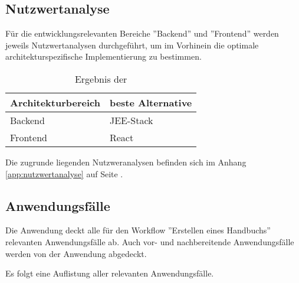\documentclass[12pt, xcolor=dvipsnames]{scrartcl}
\begin{document}
\subsection{Nutzwertanalyse}
\label{sec:nutzwertanalyse}

Für die entwicklungsrelevanten Bereiche ''Backend'' und ''Frontend'' werden jeweils Nutzwertanalysen durchgeführt, um im Vorhinein die optimale architekturspezifische Implementierung zu bestimmen.

\begin{table}[H]
	\centering
	\begin{tabular}{ll}

		\rowcolor{white!15}				
		\textbf{Architekturbereich} & \textbf{beste Alternative} \\\hline		
				
		Backend & JEE-Stack \\
		Frontend & React	\\	
			    
	\end{tabular}
	\caption{Ergebnis der }
	\label{tab:nutzwertanalyse}
\end{table}

Die zugrunde liegenden Nutzweranalysen befinden sich im Anhang \ref{app:nutzwertanalyse} auf Seite \pageref{app:nutzwertanalyse}.

\subsection{Anwendungsfälle}

Die Anwendung deckt alle für den Workflow ''Erstellen eines Handbuchs'' relevanten Anwendungsfälle ab. Auch vor- und nachbereitende Anwendungsfälle werden von der Anwendung abgedeckt.

Es folgt eine Auflistung aller relevanten Anwendungsfälle.
\end{document}
